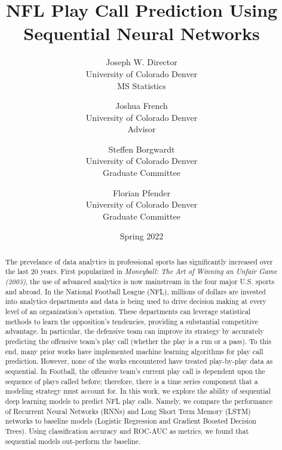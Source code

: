 \documentclass{article}
\title{NFL Play Call Prediction Using Sequential Neural Networks}
\author{Joseph W. Director  \\
	University of Colorado Denver \\
    MS Statistics
	\and 
	Joshua French \\
    University of Colorado Denver \\
    Advisor
    \and
    Steffen Borgwardt \\
    University of Colorado Denver \\
    Graduate Committee
    \and
    Florian Pfender \\
    University of Colorado Denver \\
    Graduate Committee
	}
\date{Spring 2022}
\begin{document}
    
    \maketitle

    \begin{abstract}
        \centering\begin{minipage}{\dimexpr\paperwidth-12cm}
        The prevelance of data analytics in professional sports has significantly increased over the last 20 years. 
        First popularized in \emph{Moneyball: The Art of Winning an Unfair Game (2003)}, the use of advanced analytics is now mainstream in the four major U.S. sports and abroad. 
        In the National Football League (NFL), millions of dollars are invested into analytics departments and data is being used to drive decision making at every level of an organization's operation. 
        These departments can leverage statistical methods to learn the opposition's tendencies, providing a substantial competitive advantage. 
        In particular, the defensive team can improve its strategy by accurately predicting the offensive team's play call (whether the play is a run or a pass). 
        To this end, many prior works have implemented machine learning algorithms for play call prediction. 
        However, none of the works encountered have treated play-by-play data as sequential. 
        In Football, the offensive team's current play call is dependent upon the sequence of plays called before; therefore, there is a time series component that a modeling strategy must account for. 
        In this work, we explore the ability of sequential deep learning models to predict NFL play calls.
        Namely, we compare the performance of Recurrent Neural Networks (RNNs) and Long Short Term Memory (LSTM) networks to baseline models (Logistic Regression and Gradient Boosted Decision Trees). 
        Using classification accuracy and ROC-AUC as metrics, we found that sequential models out-perform the baseline. 
        \end{minipage}
    \end{abstract}
    
    \pagebreak

    \tableofcontents
    \newpage

\end{document}
